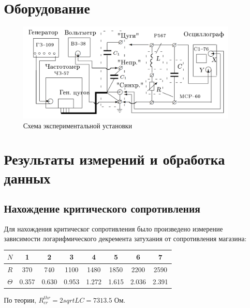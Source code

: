 \documentclass{lab}
\begin{document}
\section{Оборудование}
\begin{figure}[h!]
    \centering
    \includegraphics[width=1\linewidth]{Screenshot_2}
    \caption{Схема экспериментальной установки}
    \label{fig:set}
\end{figure}

\section{Результаты измерений и обработка данных}

\subsection {Нахождение критического сопротивления}

Для нахождения критическог сопротивления было произведено измерение зависимости логарифмического декремента затухания от сопротивления магазина:

\begin{table}[h!]
    \begin{center}
        \begin{tabular}{|c|c|c|c|c|c|c|c|}
            \hline
            $N$       & 1       & 2       & 3     & 4     & 5     & 6     & 7     \\ \hline
            $R$       & 370     & 740     & 1100  & 1480  & 1850  & 2200  & 2590  \\ \hline
            $\Theta$  & 0.357   & 0.630   & 0.953 & 1.272 & 1.615 & 2.036 & 2.391 \\ \hline
        \end{tabular}
    \end{center}
\end{table}

По теории, $R_{cr}^{thr} = 2 sqrt{L}{C} = 7313.5$ Ом.
\end{document}
